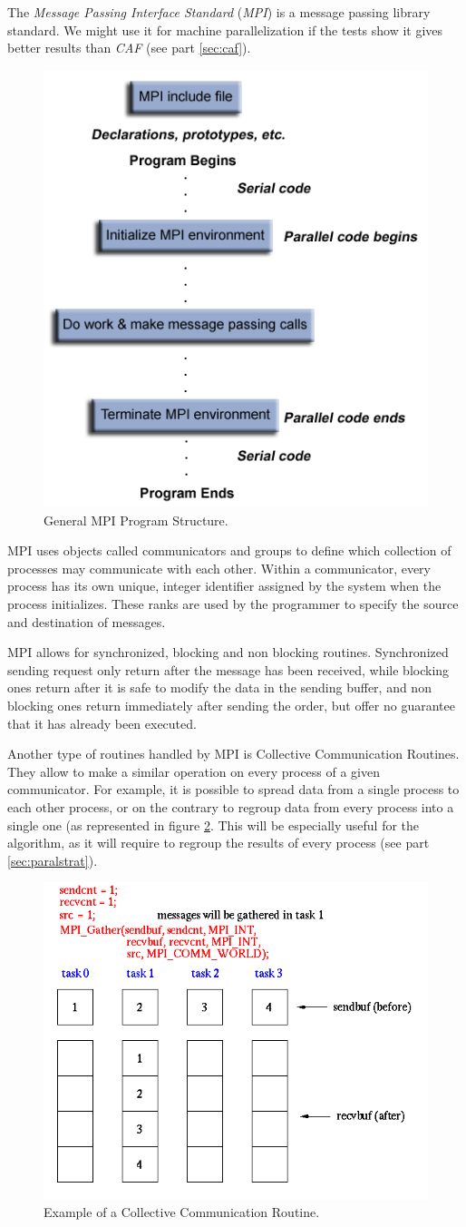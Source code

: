 The \emph{Message Passing Interface Standard} (\emph{MPI}) is a message passing library standard.
We might use it for machine parallelization if the tests show it gives better results than \emph{CAF} (see part \ref{sec:caf}).

\begin{figure}[!h]
\centering
\includegraphics[width=.5\textwidth]{Parallelisation_FW/MPI/Img/prog_structure.png}
\caption{General MPI Program Structure. \cite{mpi_tuto}}
\label{fig:mpi_struct}
\end{figure}

MPI uses objects called communicators and groups to define which collection of processes may communicate with each other.
Within a communicator, every process has its own unique, integer identifier assigned by the system when the process initializes.
These ranks are used by the programmer to specify the source and destination of messages.

MPI allows for synchronized, blocking and non blocking routines.
Synchronized sending request only return after the message has been received, while blocking ones return after it is safe to modify the data in the sending buffer, and non blocking ones return immediately after sending the order, but offer no guarantee that it has already been executed.

Another type of routines handled by MPI is Collective Communication Routines.
They allow to make a similar operation on every process of a given communicator.
For example, it is possible to spread data from a single process to each other process, or on the contrary to regroup data from every process into a single one (as represented in figure \ref{fig:mpi_ccr}.
This will be especially useful for the algorithm, as it will require to regroup the results of every process (see part \ref{sec:paralstrat}).

\begin{figure}[!h]
\centering
\includegraphics[width=.6\textwidth]{Parallelisation_FW/MPI/Img/MPI_Gather.png}
\caption{Example of a Collective Communication Routine. \cite{mpi_tuto}}
\label{fig:mpi_ccr}
\end{figure}